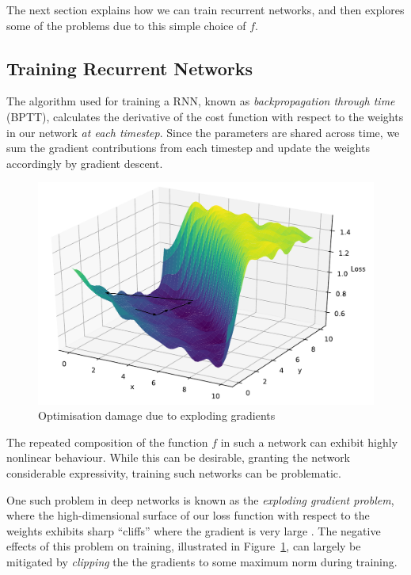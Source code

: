 \documentclass[12pt,a4paper,twoside,openright]{report}
\begin{document}
The next section explains how we can train recurrent networks, and then explores
some of the problems due to this simple choice of $f$.

\subsection{Training Recurrent Networks}\label{sec:rnn-train}

The algorithm used for training a RNN, known as \emph{backpropagation through
time} (BPTT), calculates the derivative of the cost function with respect to the
weights in our network \emph{at each timestep}. Since the parameters are shared
across time, we sum the gradient contributions from each timestep and update the
weights accordingly by gradient descent.

\begin{figure}[H]
\centering
\includegraphics[width=400pt]{figs/exploding_gradients.pdf}
\caption{Optimisation damage due to exploding gradients}
\label{fig:exploding-grad}
\end{figure}

The repeated composition of the function $f$ in such a network can exhibit
highly nonlinear behaviour. While this can be desirable, granting the network
considerable expressivity, training such networks can be problematic. 

One such problem in deep networks is known as the \emph{exploding gradient
problem}, where the high-dimensional surface of our loss function with respect
to the weights exhibits sharp ``cliffs'' where the gradient is very large
\cite{Goodfellow-et-al-2016}. The negative effects of this problem on training,
illustrated in Figure~\ref{fig:exploding-grad}, can largely be mitigated by
\emph{clipping} the the gradients to some maximum norm during training.
\end{document}
